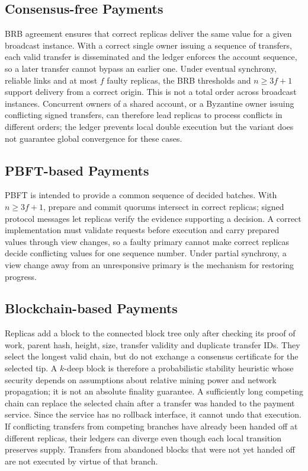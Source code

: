 \documentclass[sigconf,a4paper]{acmart}
\begin{document}
    \subsection{Consensus-free Payments}

    BRB agreement ensures that correct replicas deliver the same value for a
    given broadcast instance. With a correct single owner issuing a sequence of
    transfers, each valid transfer is disseminated and the ledger enforces the
    account sequence, so a later transfer cannot bypass an earlier one. Under
    eventual synchrony, reliable links and at most $f$ faulty replicas, the BRB
    thresholds and $n\geq3f+1$ support delivery from a correct origin. This is
    not a total order across broadcast instances. Concurrent owners of a shared
    account, or a Byzantine owner issuing conflicting signed transfers, can
    therefore lead replicas to process conflicts in different orders; the
    ledger prevents local double execution but the variant does not guarantee
    global convergence for these cases.

    \subsection{PBFT-based Payments}

    PBFT is intended to provide a common sequence of decided batches. With
    $n\geq3f+1$, prepare and commit quorums intersect in correct replicas; signed
    protocol messages let replicas verify the evidence supporting a decision.
    A correct implementation must validate requests before execution and carry
    prepared values through view changes, so a faulty primary cannot make
    correct replicas decide conflicting values for one sequence number. Under
    partial synchrony, a view change away from an unresponsive primary is the
    mechanism for restoring progress.

    \subsection{Blockchain-based Payments}

    Replicas add a block to the connected block tree only after checking its
    proof of work, parent hash, height, size, transfer validity and duplicate
    transfer IDs. They select the longest valid chain, but do not exchange a
    consensus certificate for the selected tip. A $k$-deep block is therefore
    a probabilistic stability heuristic whose security depends on assumptions
    about relative mining power and network propagation; it is not an absolute
    finality guarantee. A sufficiently long competing chain can replace the
    selected chain after a transfer was handed to the payment service. Since
    the service has no rollback interface, it cannot undo that execution. If
    conflicting transfers from competing branches have already been handed off
    at different replicas, their ledgers can diverge even though each local
    transition preserves supply. Transfers from abandoned blocks that were not
    yet handed off are not executed by virtue of that branch.
\end{document}
